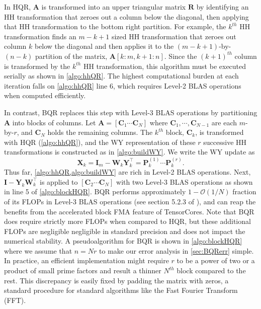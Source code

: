 \documentclass[review,onefignum,onetabnum]{siamart190516}
\newcommand{\bb}[1]{\mathbf{#1}}
\newcommand{\cO}{\mathcal{O}}
\begin{document}
In HQR, $\bb{A}$ is transformed into an upper triangular matrix $\bb{R}$ by identifying an HH transformation that zeroes out a column below the diagonal, then applying that HH transformation to the bottom right partition. 
For example, the $k^{th}$ HH transformation finds an $m-k+1$ sized HH transformation that zeroes out column $k$ below the diagonal and then applies it to the $(m-k+1)$-by-$(n-k)$ partition of the matrix, $\bb{A}[k:m,k+1:n]$.
Since the $(k+1)^{th}$ column is transformed by the $k^{th}$ HH transformation, this algorithm must be executed serially as shown in \cref{algo:hhQR}.
The highest computational burden at each iteration falls on \cref{algo:hhQR} line 6, which requires Level-2 BLAS operations when computed efficiently. \par

In contrast, BQR replaces this step with Level-3 BLAS operations by partitioning $\bb{A}$ into blocks of columns.
Let $\bb{A} = [\bb{C}_1 \cdots  \bb{C}_N]$ where $\bb{C}_1,\cdots,\bb{C}_{N-1}$ are each $m$-by-$r$, and $\bb{C}_N$ holds the remaining columns.
The $k^{th}$ block, $\bb{C}_k$, is transformed with HQR (\cref{algo:hhQR}), and the WY representation of these $r$ successive HH transformations is constructed as in \cref{algo:buildWY}.
We write the WY update as
\begin{equation}
	\bb{X}_k = \bb{I}_m -\bb{W}_{k}\bb{Y}_{k}^{\top} = \bb{P}_k^{(1)}\cdots\bb{P}_{k}^{(r)}.
\end{equation}
Thus far, \cref{algo:hhQR,algo:buildWY} are rich in Level-2 BLAS operations.
Next, $\bb{I} -\bb{Y}_{k}\bb{W}_{k}^{\top}$ is applied to $[\bb{C}_2 \cdots  \bb{C}_N]$ with two Level-3 BLAS operations as shown in line 5 of \cref{algo:blockHQR}.
BQR performs approximately $1-\cO(1/N)$ fraction of its FLOPs in Level-3 BLAS operations (see section 5.2.3 of \cite{golub2013matrix}), and can reap the benefits from the accelerated block FMA feature of TensorCores. 
Note that BQR does require strictly more FLOPs when compared to HQR, but these additional FLOPs are negligible negligible in standard precision and does not impact the numerical stability.
A pseudoalgorithm for BQR is shown in \cref{algo:blockHQR} where we assume that $n=Nr$ to make our error analysis in \cref{sec:BQRerr} simple.
In practice, an efficient implementation might require $r$ to be a power of two or a product of small prime factors and result a thinner $N^{th}$ block compared to the rest. 
This discrepancy is easily fixed by padding the matrix with zeros, a standard procedure for standard algorithms like the Fast Fourier Transform (FFT).
\end{document}
